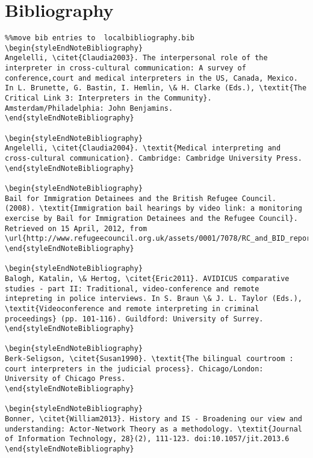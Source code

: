 \documentclass[output=paper]{langsci/langscibook}
\begin{document}
\section{Bibliography}

\begin{verbatim}%%move bib entries to  localbibliography.bib
\begin{styleEndNoteBibliography}
Angelelli, \citet{Claudia2003}. The interpersonal role of the interpreter in cross-cultural communication: A survey of conference,court and medical interpreters in the US, Canada, Mexico. In L. Brunette, G. Bastin, I. Hemlin, \& H. Clarke (Eds.), \textit{The Critical Link 3: Interpreters in the Community}. Amsterdam/Philadelphia: John Benjamins.
\end{styleEndNoteBibliography}

\begin{styleEndNoteBibliography}
Angelelli, \citet{Claudia2004}. \textit{Medical interpreting and cross-cultural communication}. Cambridge: Cambridge University Press.
\end{styleEndNoteBibliography}

\begin{styleEndNoteBibliography}
Bail for Immigration Detainees and the British Refugee Council. (2008). \textit{Immigration bail hearings by video link: a monitoring exercise by Bail for Immigration Detainees and the Refugee Council}. Retrieved on 15 April, 2012, from \url{http://www.refugeecouncil.org.uk/assets/0001/7078/RC_and_BID_report_on_Bail_hearings_and_video_links_Mar_08}
\end{styleEndNoteBibliography}

\begin{styleEndNoteBibliography}
Balogh, Katalin, \& Hertog, \citet{Eric2011}. AVIDICUS comparative studies - part II: Traditional, video-conference and remote intepreting in police interviews. In S. Braun \& J. L. Taylor (Eds.), \textit{Videoconference and remote interpreting in criminal proceedings} (pp. 101-116). Guildford: University of Surrey.
\end{styleEndNoteBibliography}

\begin{styleEndNoteBibliography}
Berk-Seligson, \citet{Susan1990}. \textit{The bilingual courtroom : court interpreters in the judicial process}. Chicago/London: University of Chicago Press.
\end{styleEndNoteBibliography}

\begin{styleEndNoteBibliography}
Bonner, \citet{William2013}. History and IS - Broadening our view and understanding: Actor-Network Theory as a methodology. \textit{Journal of Information Technology, 28}(2), 111-123. doi:10.1057/jit.2013.6
\end{styleEndNoteBibliography}


\end{verbatim}
\end{document}
